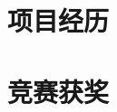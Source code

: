 \documentclass{resume}
\begin{document}


\section{\faFlask\ 项目经历}

\section{\faTrophy\ 竞赛获奖}


\end{document}
